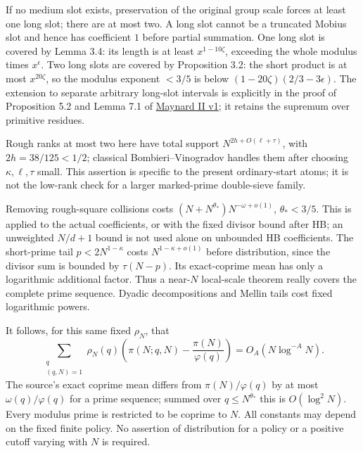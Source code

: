 If no medium slot exists, preservation of the original group scale
forces at least one long slot; there are at most two. A long slot
cannot be a truncated Mobius slot and hence has coefficient \(1\)
before partial summation. One long slot is covered by Lemma 3.4:
its length is at least \(x^{1-10\zeta}\), exceeding the whole modulus
times \(x^\epsilon\). Two long slots are covered by Proposition 3.2:
the short product is at most \(x^{20\zeta}\), so the modulus exponent
\(<3/5\) is below \((1-20\zeta)(2/3-3\epsilon)\).
The extension to separate arbitrary long-slot intervals is explicitly
in the proof of Proposition 5.2 and Lemma 7.1 of
\href{https://arxiv.org/abs/2006.07088v1}{Maynard II v1};
it retains the supremum over primitive residues.

Rough ranks at most two here have total support
\(N^{2h+O(\ell+\tau)}\), with \(2h=38/125<1/2\); classical
Bombieri--Vinogradov handles them after choosing \(\kappa,\ell,\tau\)
small. This assertion is specific to the present ordinary-start
atoms; it is not the low-rank check for a larger marked-prime
double-sieve family.

Removing rough-square collisions costs
\((N+N^{\theta_*})N^{-\omega+o(1)}\), \(\theta_*<3/5\).
This is applied to the actual coefficients, or with the fixed divisor
bound after HB; an unweighted \(N/d+1\) bound is not used alone on
unbounded HB coefficients. The short-prime tail
\(p<2N^{1-\kappa}\) costs \(N^{1-\kappa+o(1)}\) before distribution,
since the divisor sum is bounded by \(\tau(N-p)\). Its exact-coprime
mean has only a logarithmic additional factor. Thus a near-\(N\)
local-scale theorem really covers the complete prime sequence.
Dyadic decompositions and Mellin tails cost fixed logarithmic powers.

It follows, for this same fixed \(\rho_N\), that
\begin{equation}\label{eq:own-lower-signed-prime-remainder}
 \sum_{\substack{q\\(q,N)=1}}\rho_N(q)
 \left(\pi(N;q,N)-\frac{\pi(N)}{\varphi(q)}\right)
 =O_A(N\log^{-A}N).
\end{equation}
The source's exact coprime mean differs from \(\pi(N)/\varphi(q)\)
by at most \(\omega(q)/\varphi(q)\) for a prime sequence; summed over
\(q\le N^{\theta_*}\) this is \(O(\log^2N)\).
Every modulus prime is restricted to be coprime to \(N\).
All constants may depend on the fixed finite policy. No assertion
of distribution for a policy or a positive cutoff varying with \(N\)
is required.

